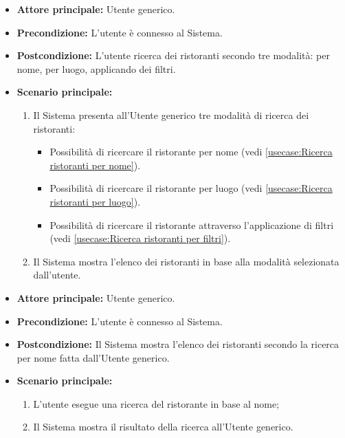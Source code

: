 \label{usecase:Ricerca di ristoranti}
\begin{itemize}
	\item \textbf{Attore principale:} Utente generico.

	\item \textbf{Precondizione:}
	      L'utente è connesso al Sistema.

	\item \textbf{Postcondizione:} L'utente ricerca dei ristoranti secondo tre modalità: per nome, per luogo, applicando dei filtri.

	\item \textbf{Scenario principale:}
	      \begin{enumerate}
		      \item Il Sistema presenta all'Utente generico tre modalità di ricerca dei ristoranti:
		            \begin{itemize}
			            \item Possibilità di ricercare il ristorante per nome (vedi \autoref{usecase:Ricerca ristoranti per nome}).
			            \item Possibilità di ricercare il ristorante per luogo (vedi \autoref{usecase:Ricerca ristoranti per luogo}).
			            \item Possibilità di ricercare il ristorante attraverso l'applicazione di filtri (vedi \autoref{usecase:Ricerca ristoranti per filtri}).
		            \end{itemize}

		      \item Il Sistema mostra l'elenco dei ristoranti in base alla modalità selezionata dall'utente.

	      \end{enumerate}
\end{itemize}


\label{usecase:Ricerca ristoranti per nome}
\begin{itemize}
	\item \textbf{Attore principale:} Utente generico.

	\item \textbf{Precondizione:} L'utente è connesso al Sistema.

	\item \textbf{Postcondizione:} Il Sistema mostra l'elenco dei ristoranti secondo la ricerca per nome fatta dall'Utente generico.

	\item \textbf{Scenario principale:}
	      \begin{enumerate}
		      \item L'utente esegue una ricerca del ristorante in base al nome;
		      \item Il Sistema mostra il risultato della ricerca all'Utente generico.
	      \end{enumerate}
\end{itemize}

